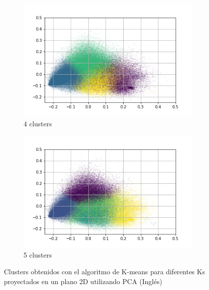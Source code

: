 \begin{figure}
\begin{subfigure}[b]{0.4\textwidth}
         \includegraphics[width=\textwidth]{results/TopicDetection/en/PCA_4.png}
         \caption{4 clusters}
         \label{fig:es_kmeans_4}
     \end{subfigure}
     \hfill
     \begin{subfigure}[b]{0.4\textwidth}
         \centering
         \includegraphics[width=\textwidth]{results/TopicDetection/en/PCA_5.png}
         \caption{5 clusters}
         \label{fig:es_kmeans_5}
     \end{subfigure}
        \caption{Clusters obtenidos con el algoritmo de K-means para diferentes Ks proyectados en un plano 2D utilizando PCA (Inglés)}
        \label{fig:en_kmeans}
\end{figure}

